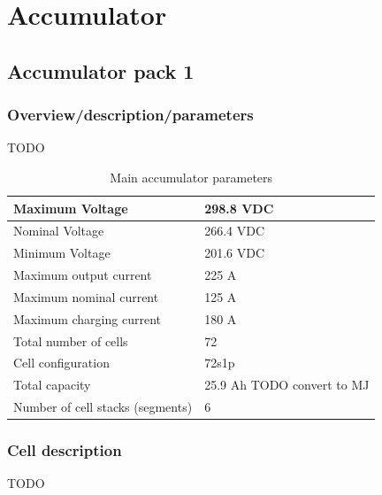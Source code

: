 \documentclass{article}
\begin{document}
\section{Accumulator}\label{accumulator}
\subsection{Accumulator pack 1}\label{accumulator_pack_1}
\subsubsection{Overview/description/parameters}\label{accumulator_overview}
TODO

	\begin{table}[H]
	    \centering
	    \begin{tabular}{|l|l|}
	        \hline
	        Maximum Voltage & 298.8 VDC \\ \hline
	        Nominal Voltage & 266.4 VDC \\ \hline
	        Minimum Voltage & 201.6 VDC \\ \hline
	        Maximum output current & 225 A \\ \hline
	        Maximum nominal current & 125 A \\ \hline
	        Maximum charging current & 180 A \\ \hline
	        Total number of cells & 72 \\ \hline
	        Cell configuration & 72s1p \\ \hline
	        Total capacity & 25.9 Ah TODO convert to MJ \\ \hline
	        Number of cell stacks (segments) & 6 \\ \hline
	    \end{tabular}
	    \caption{Main accumulator parameters}
	    \label{batterytable}
	\end{table}

\subsubsection{Cell description}\label{accumulator_cell_description}
TODO
\end{document}
